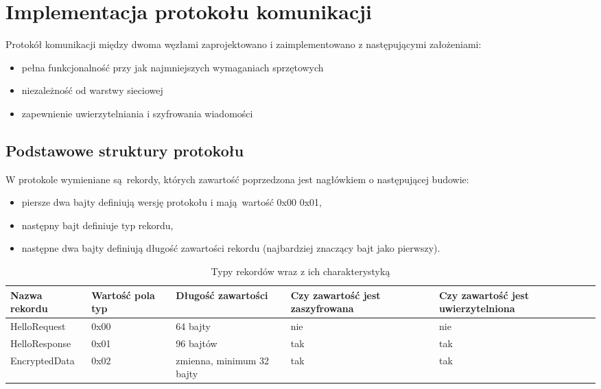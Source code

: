 \chapter{Implementacja protokołu komunikacji}
\label{cha:implementacja}

Protokół komunikacji między dwoma węzłami zaprojektowano i zaimplementowano z następującymi założeniami:

\begin{itemize}
\item pełna funkcjonalność przy jak najmniejszych wymaganiach sprzętowych
\item niezależność od warstwy sieciowej
\item zapewnienie uwierzytelniania i szyfrowania wiadomości
\end{itemize}

\section{Podstawowe struktury protokołu}
\label{sec:proto}

W protokole wymieniane są rekordy, których zawartość poprzedzona jest nagłówkiem o następującej budowie:

\begin{itemize}
\item piersze dwa bajty definiują wersję protokołu i mają wartość 0x00 0x01,
\item następny bajt definiuje typ rekordu,
\item następne dwa bajty definiują długość zawartości rekordu (najbardziej znaczący bajt jako pierwszy).
\end{itemize}

\begin{table}[t]
\centering
\begin{tabular}{|l|p{1.4cm}|l|p{2.9cm}|p{3.1cm}|}
    \hline
    \textbf{Nazwa rekordu}  &
    \textbf{Wartość pola typ}  &
    \textbf{Długość zawartości}  &
    \textbf{Czy zawartość jest zaszyfrowana}  &
    \textbf{Czy zawartość jest uwierzytelniona}\\
    \hline
    HelloRequest & 0x00 & 64 bajty & nie & nie\\
    \hline
    HelloResponse & 0x01 & 96 bajtów & tak & tak\\
    \hline
    EncryptedData & 0x02 & zmienna, minimum 32 bajty & tak & tak\\
    \hline
\end{tabular}
\caption{Typy rekordów wraz z ich charakterystyką}
\label{tab:recordtypes}
\end{table}


